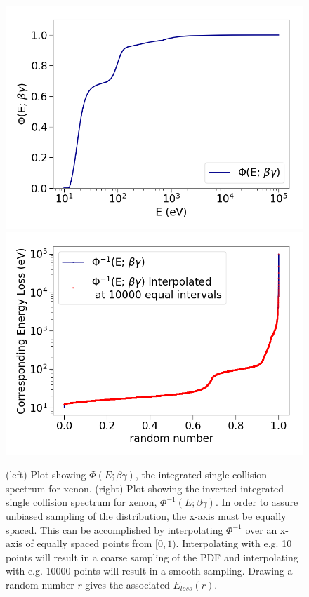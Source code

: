 \begin{figure}[htbp]
\begin{center}
\includegraphics[width=\halffig]{figures/lips/phi.png}
\includegraphics[width=\halffig]{figures/lips/phi_inverted.png}
\caption{(left) Plot showing $\Phi(E; \beta \gamma)$, the integrated single collision spectrum for xenon. (right) Plot showing the inverted integrated single collision spectrum for xenon, $\Phi^{-1}(E; \beta \gamma)$. In order to assure unbiased sampling of the distribution, the x-axis must be equally spaced. This can be accomplished by interpolating $\Phi^{-1}$ over an x-axis of equally spaced points from $[0,1)$. Interpolating with e.g. 10 points will result in a coarse sampling of the \acs{PDF} and interpolating with e.g. 10000 points will result in a smooth sampling. Drawing a random number $r$ gives the associated $E_{loss}(r)$. }
\label{fig:phi}
\end{center}
\end{figure}

